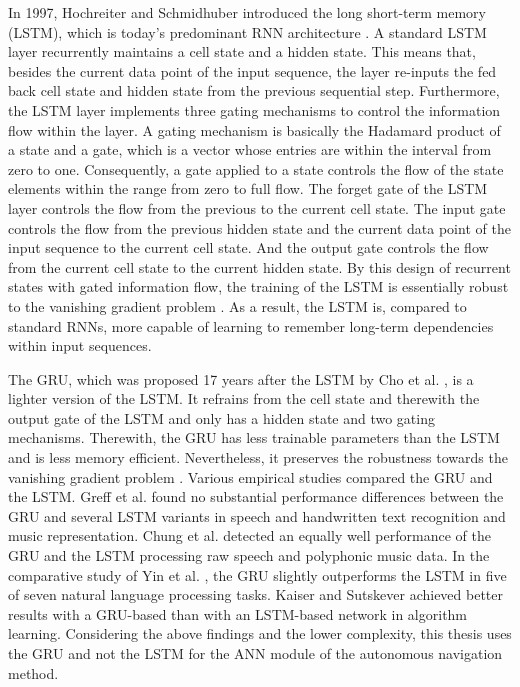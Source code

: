 In 1997, Hochreiter and Schmidhuber \cite{Hochreiter1997} 
introduced the long short-term memory (LSTM), 
which is today's predominant RNN architecture \cite{schmidhuber_2021}. 
A standard LSTM layer
recurrently maintains a cell state and a hidden state. 
This means that, besides the current data point of the input sequence, 
the layer re-inputs the fed back cell state and hidden state 
from the previous sequential step. 
Furthermore, the LSTM layer implements three gating mechanisms 
to control the information flow within the layer. 
A gating mechanism is basically the Hadamard product 
of a state and a gate, 
which is a vector whose entries are within the interval from zero to one. 
Consequently, a gate applied to a state controls the flow 
of the state elements within the range from zero to full flow. 
The forget gate of the LSTM layer controls the flow 
from the previous to the current cell state. 
The input gate controls the flow from the previous hidden state 
and the current data point of the input sequence 
to the current cell state. 
And the output gate controls the flow from the current cell state 
to the current hidden state. 
By this design of recurrent states with gated information flow, 
the training of the LSTM is essentially robust 
to the vanishing gradient problem \cite{pascanu2013difficulty}. 
As a result, the LSTM is, compared to standard RNNs, 
more capable of learning to remember long-term dependencies 
within input sequences.


The GRU, which was proposed 17 years after the LSTM by 
Cho et al. \cite{Cho2014}, 
is a lighter version of the LSTM. 
It refrains from the cell state and therewith the output gate of the LSTM 
and only has a hidden state and two gating mechanisms. 
Therewith, the GRU has less trainable parameters 
than the LSTM and is less memory efficient. 
Nevertheless, it preserves the robustness towards 
the vanishing gradient problem \cite{ICE2020}. 
Various empirical studies compared the GRU and the LSTM. 
Greff et al. \cite{Greff2017} found no substantial performance 
differences between the GRU and several LSTM variants 
in speech and handwritten text recognition and music representation. 
Chung et al. \cite{Chung2014} detected an equally well performance 
of the GRU and the LSTM processing raw speech and polyphonic music data. 
In the comparative study of Yin et al. \cite{Yin2017}, 
the GRU slightly outperforms the LSTM 
in five of seven natural language processing tasks. 
Kaiser and Sutskever \cite{Kaiser2015} achieved better 
results with a GRU-based than with an LSTM-based network 
in algorithm learning. 
Considering the above findings and the lower complexity, 
this thesis uses the GRU and not the LSTM 
for the ANN module of the autonomous navigation method.




